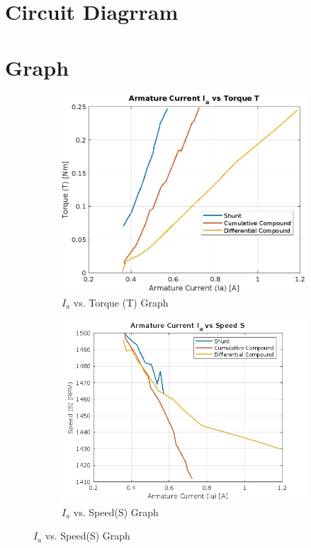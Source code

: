 \documentclass[a4paper,12pt]{article}
\begin{document}
	\section{Circuit Diagrram}
	
	
	
	
	
	\newpage
	
	
	
	
	
	
	\section{Graph}
	
	
	
	
	
	\begin{figure}[H]
		\centering
		\begin{subfigure}[t]{1\textwidth}
			\centering
			\includegraphics[width=0.85\linewidth]{Images/1.2}
			\caption{ $I_a$ vs. Torque (T) Graph }
			\vspace{0.1cm}
		\end{subfigure}
		
		\begin{subfigure}[t]{1\textwidth}
			\centering
			\includegraphics[width=0.95\linewidth]{Images/2.1}
			\caption{ $I_a$ vs. Speed(S) Graph}
		\end{subfigure}
		
		
	\end{figure}
	
\end{document}
